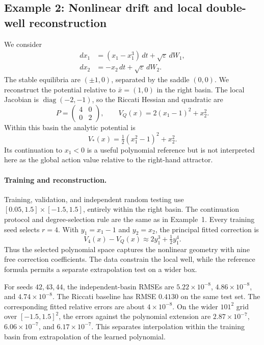 \documentclass[11pt]{article}
\theoremstyle{plain}      %
\theoremstyle{definition} %
\begin{document}
\FloatBarrier
\subsection{Example 2: Nonlinear drift and local double-well reconstruction}\label{sec:example2_kernels}
We consider
\begin{equation}\label{sde2}
\begin{aligned}
 dx_1&=(x_1-x_1^3)\,dt+\sqrt\varepsilon\,dW_1,\\
 dx_2&=-x_2\,dt+\sqrt\varepsilon\,dW_2.
\end{aligned}
\end{equation}
The stable equilibria are $(\pm1,0)$, separated by the saddle $(0,0)$. We reconstruct the potential relative to $\bar x=(1,0)$ in the right basin. The local Jacobian is $\operatorname{diag}(-2,-1)$, so the Riccati Hessian and quadratic are
\[
 P=\begin{pmatrix}4&0\\0&2\end{pmatrix},\qquad
 V_Q(x)=2(x_1-1)^2+x_2^2.
\]
Within this basin the analytic potential is
\begin{equation}\label{eq:dw-reference}
 V_*(x)=\tfrac12(x_1^2-1)^2+x_2^2.
\end{equation}
Its continuation to $x_1<0$ is a useful polynomial reference but is not interpreted here as the global action value relative to the right-hand attractor.

\paragraph{Training and reconstruction.}
Training, validation, and independent random testing use $[0.05,1.5]\times[-1.5,1.5]$, entirely within the right basin. The continuation protocol and degree-selection rule are the same as in Example~1. Every training seed selects $r=4$. With $y_1=x_1-1$ and $y_2=x_2$, the principal fitted correction is
\[
 V_4(x)-V_Q(x)\approx 2y_1^3+\tfrac12y_1^4.
\]
Thus the selected polynomial space captures the nonlinear geometry with nine free correction coefficients. The data constrain the local well, while the reference formula permits a separate extrapolation test on a wider box.



For seeds $42,43,44$, the independent-basin RMSEs are $5.22\times10^{-8}$, $4.86\times10^{-8}$, and $4.74\times10^{-8}$. The Riccati baseline has RMSE $0.4130$ on the same test set. The corresponding fitted relative errors are about $4\times10^{-8}$. On the wider $101^2$ grid over $[-1.5,1.5]^2$, the errors against the polynomial extension are $2.87\times10^{-7}$, $6.06\times10^{-7}$, and $6.17\times10^{-7}$. This separates interpolation within the training basin from extrapolation of the learned polynomial.
\end{document}
